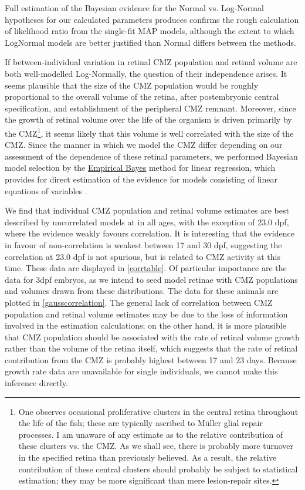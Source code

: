 Full estimation of the Bayesian evidence for the Normal vs. Log-Normal hypotheses for our calculated parameters produces confirms the rough calculation of likelihood ratio from the single-fit MAP models, although the extent to which LogNormal models are better justified than Normal differs between the methods.

If between-individual variation in retinal CMZ population and retinal volume are both well-modelled Log-Normally, the question of their independence arises. It seems plausible that the size of the CMZ population would be roughly proportional to the overall volume of the retina, after postembryonic central specification, and establishment of the peripheral CMZ remnant. Moreover, since the growth of retinal volume over the life of the organism is driven primarily by the CMZ\footnote{One observes occasional proliferative clusters in the central retina throughout the life of the fish; these are typically ascribed to M\"{u}ller glial repair processes. I am unaware of any estimate as to the relative contribution of these clusters vs. the CMZ. As we shall see, there is probably more turnover in the specified retina than previously believed. As a result, the relative contribution of these central clusters should probably be subject to statistical estimation; they may be more significant than mere lesion-repair sites.}, it seems likely that this volume is well correlated with the size of the CMZ. Since the manner in which we model the CMZ differ depending on our assessment of the dependence of these retinal parameters, we performed Bayesian model selection by the \hyperref[ssec:EmpiricalBayes]{Empirical Bayes} method for linear regression, which provides for direct estimation of the evidence for models consisting of linear equations of variables \cite{Bishop2006}.

We find that individual CMZ population and retinal volume estimates are best described by uncorrelated models at in all ages, with the exception of 23.0 dpf, where the evidence weakly favours correlation. It is interesting that the evidence in favour of non-correlation is weakest between 17 and 30 dpf, suggesting the correlation at 23.0 dpf is not spurious, but is related to CMZ activity at this time. These data are displayed in \autoref{corrtable}. Of particular importance are the data for 3dpf embryos, as we intend to seed model retinae with CMZ populations and volumes drawn from these distributions. The data for these animals are plotted in \autoref{gausscorrelation}. The general lack of correlation between CMZ population and retinal volume estimates may be due to the loss of information involved in the estimation calculations; on the other hand, it is more plausible that CMZ population should be associated with the rate of retinal volume growth rather than the volume of the retina itself, which suggests that the rate of retinal contribution from the CMZ is probably highest between 17 and 23 days. Because growth rate data are unavailable for single individuals, we cannot make this inference directly.

